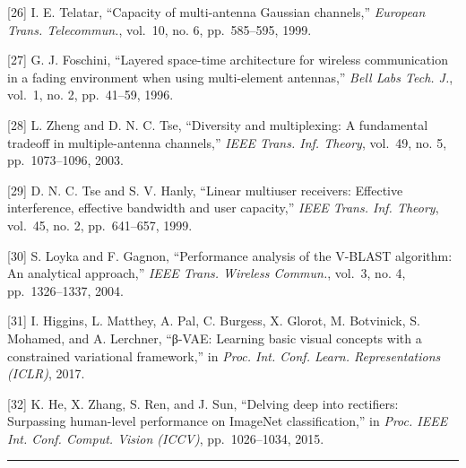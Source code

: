 {[}26{]} I. E. Telatar, ``Capacity of multi-antenna Gaussian channels,'' \emph{European Trans. Telecommun.}, vol.~10, no. 6, pp.~585--595, 1999.

{[}27{]} G. J. Foschini, ``Layered space-time architecture for wireless communication in a fading environment when using multi-element antennas,'' \emph{Bell Labs Tech. J.}, vol.~1, no. 2, pp.~41--59, 1996.

{[}28{]} L. Zheng and D. N. C. Tse, ``Diversity and multiplexing: A fundamental tradeoff in multiple-antenna channels,'' \emph{IEEE Trans. Inf. Theory}, vol.~49, no. 5, pp.~1073--1096, 2003.

{[}29{]} D. N. C. Tse and S. V. Hanly, ``Linear multiuser receivers: Effective interference, effective bandwidth and user capacity,'' \emph{IEEE Trans. Inf. Theory}, vol.~45, no. 2, pp.~641--657, 1999.

{[}30{]} S. Loyka and F. Gagnon, ``Performance analysis of the V-BLAST algorithm: An analytical approach,'' \emph{IEEE Trans. Wireless Commun.}, vol.~3, no. 4, pp.~1326--1337, 2004.

{[}31{]} I. Higgins, L. Matthey, A. Pal, C. Burgess, X. Glorot, M. Botvinick, S. Mohamed, and A. Lerchner, ``β-VAE: Learning basic visual concepts with a constrained variational framework,'' in \emph{Proc. Int. Conf. Learn. Representations (ICLR)}, 2017.

{[}32{]} K. He, X. Zhang, S. Ren, and J. Sun, ``Delving deep into rectifiers: Surpassing human-level performance on ImageNet classification,'' in \emph{Proc. IEEE Int. Conf. Comput. Vision (ICCV)}, pp.~1026--1034, 2015.

\begin{center}\rule{0.5\linewidth}{0.5pt}\end{center}

